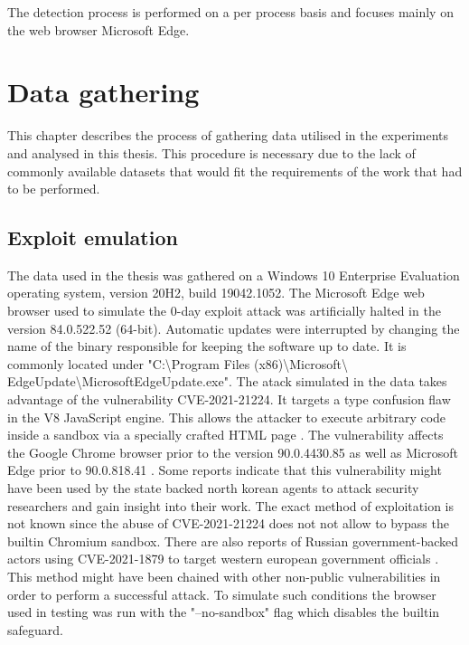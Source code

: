 \documentclass[a4paper,twoside,12pt]{book}
\begin{document}
The detection process is performed on a per process basis and focuses mainly on the web browser
Microsoft Edge.  

\chapter{Data gathering}

This chapter describes the process of gathering data utilised in the experiments and 
analysed in this thesis. This procedure is necessary due to the lack of commonly available 
datasets that would fit the requirements of the work that had to be performed. 

\section{Exploit emulation}

The data used in the thesis was gathered on a Windows 10 Enterprise Evaluation operating 
system, version 20H2, build 19042.1052. The Microsoft Edge web browser used to simulate 
the 0-day exploit attack was artificially halted in the version 84.0.522.52 (64-bit). 
Automatic updates were interrupted by changing the name of the binary responsible for 
keeping the software up to date. It is commonly located under 
"C:\textbackslash Program Files (x86)\textbackslash Microsoft\textbackslash 
EdgeUpdate\textbackslash MicrosoftEdgeUpdate.exe". 
The atack simulated in the data takes advantage of the vulnerability CVE-2021-21224. It 
targets a type confusion flaw in the V8 JavaScript engine. This allows the attacker to 
execute arbitrary code inside a sandbox via a specially crafted HTML page \cite{bib:CVE21224}. 
The vulnerability affects the Google Chrome browser prior to the version 90.0.4430.85 as 
well as Microsoft Edge prior to 90.0.818.41 \cite{bib:edgeRelease}. Some reports indicate 
that this vulnerability might have been used by the state backed north korean agents to 
attack security researchers and gain insight into their work. The exact method of
exploitation is not known since the abuse of CVE-2021-21224 does not not allow to bypass 
the builtin Chromium sandbox. There are also reports of Russian government-backed actors 
using CVE-2021-1879 to target western european government officials \cite{bib:googleBlog}. 
This method might have been chained with other non-public vulnerabilities in order to 
perform a successful attack. To simulate such conditions the browser used in testing was 
run with the "--no-sandbox" flag which disables the builtin safeguard.
\end{document}
